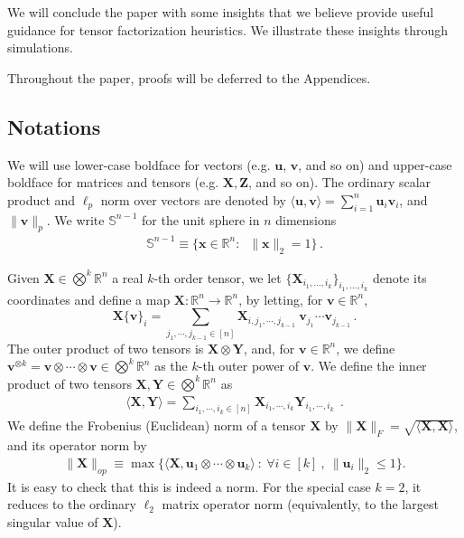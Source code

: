 \documentclass[11pt]{article}
\theoremstyle{definition}
\def\<{\langle}
\def\>{\rangle}
\def\reals{\mathbb{R}}
\def\bx{\mathbf{x}}
\def\bu{\mathbf{u}}
\def\bv{\mathbf{v}}
\def\bX{\mathbf{X}}
\def\bY{\mathbf{Y}}
\def\bZ{\mathbf{Z}}
\def\bbS{\mathbb{S}}
\begin{document}
\vspace{0.25cm}

We will conclude the paper with some insights that we believe 
provide useful guidance for tensor factorization heuristics. We
illustrate these insights through simulations.

Throughout the paper, proofs will be  deferred to the Appendices.

\subsection{Notations} 

We will use lower-case boldface for vectors (e.g. $\bu$, $\bv$, and so
on) and upper-case boldface for matrices and tensors (e.g. $\bX,\bZ$,
and so on). 
The ordinary scalar product and $\ell_p$ norm over vectors are denoted
by $\<\bu,\bv\> = \sum_{i=1}^n\bu_i\bv_i$, and $\|\bv\|_p$. 
We write
$\bbS^{n-1}$ for the unit sphere in $n$ dimensions
%
\begin{align}
%
\bbS^{n-1} \equiv\big\{\bx\in\reals^n:\; \;\|\bx\|_2=1\big\}\, .
%
\end{align}
%

Given $\bX \in \bigotimes^k \reals^n$ a real $k$-th order tensor,
we let $\{\bX_{i_1,\dots,i_k}\}_{i_1,\dots,i_k}$ denote its coordinates and define a map $\bX:\reals^n\to
\reals^n$, by letting, for $\bv\in \reals^n$,
%
\begin{equation}\label{eq:tensorVectorProduct}
%
\bX \{ \bv \}_i=   \sum_{j_1, \cdots , j_{k-1} \in [n]}
\bX_{i,j_1, \cdots , j_{k-1}} \ \bv_{j_1}\cdots \bv_{ j_{k-1}}\, .
%
\end{equation}
The outer product of two tensors is $\bX\otimes \bY$, and, for
$\bv \in \reals^n$, we define $\bv^{\otimes k} = \bv \otimes \cdots
\otimes \bv \in \bigotimes^k\reals^n$ 
as the $k$-th outer power of $\bv$. We define the inner product of two tensors $\bX, \bY \in \bigotimes^k \reals^n$ as 
%
\begin{align}
%
 \< \bX , \bY \> = \sum_{i_1, \cdots ,i_k \in [n] } \bX_{i_1, \cdots
  ,i_k} \bY_{i_1, \cdots ,i_k}~~.
%
\end{align}
%
We define the Frobenius (Euclidean) norm of a tensor $\bX$  by
$\|\bX\|_F = \sqrt{\<\bX,\bX\>}$, and its operator 
norm by 
%
\begin{align}
%
\|\bX\|_{op} \equiv\max \{ \< \bX,\bu_1\otimes \cdots \otimes \bu_k
\>~:~\forall i\in [k]~,~\|\bu_i\|_2\leq 1 \}.
%
\end{align}
%
It is easy to check that this is indeed a norm. For the special case
$k=2$, it reduces to the ordinary $\ell_2$ matrix operator norm
(equivalently, to the largest singular value of $\bX$).
\end{document}
